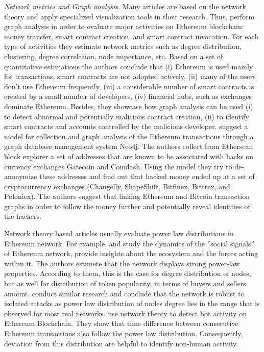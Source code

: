 \textit{Network metrics and Graph analysis}. Many articles are based on the network theory and apply specialized visualization tools in their research.
Thus, \cite{chen2018understanding} perform graph analysis in order to evaluate major activities on Ethereum blockchain: money transfer, smart contract creation, and smart contract invocation. 
For each type of activities they estimate network metrics such as degree distribution, clustering, degree correlation, node importance, etc. 
Based on a set of quantitative estimations the authors conclude that (i) Ethereum is used mainly for transactions, smart contracts are not adopted actively, (ii) many of the users don't use Ethereum frequently, (iii) a considerable number of smart contracts is created by a small number of developers, (iv) financial hubs, such as exchanges dominate Ethereum.
Besides, they showcase how graph analysis can be used (i) to detect abnormal and potentially malicious contract creation, (ii) to identify smart contracts and accounts controlled by the malicious developer.
\cite{chan2017Ethereum} suggest a model for collection and graph analysis of the Ethereum transactions through a graph database management system Neo4j. 
The authors collect from Etherscan block explorer a set of addresses that are known to be associated with hacks on currency exchanges Gatecoin and Coindash. 
Using the model they try to de-anonymize these addresses and find out that hacked money ended up at a set of cryptocurrency exchanges (Changelly, ShapeShift, Bitfinex, Bittrex, and Poloniex). 
The authors suggest that linking Ethereum and Bitcoin transaction graphs in order to follow the money further and potentially reveal identities of the hackers.

Network theory based articles usually evaluate power law distributions in Ethereum network.
For example, \cite{somin2018social} and \cite{somin2018network} study the dynamics of the ”social signals” of Ethereum network, provide insights about the ecosystem and the forces acting within it.
The authors estimete that the network displays strong power-law properties.
According to them, this is the case for degree distribution of nodes, but as well for distribution of token popularity, in terms of buyers and sellers amount.
\cite{anoaica2018quantitative} conduct similar research and conclude that the network is robust to isolated attacks as power law distribution of nodes degree lies in the range that is observed for most real networks.
\cite{zwang2018detecting} use network theory to detect bot activity on Ethereum Blockchain. 
They show that time difference between consecutive Ethereum transactions also follow the power law distribution.
Consequently, deviation from this distribution are helpful to identify non-human activity. 
 
